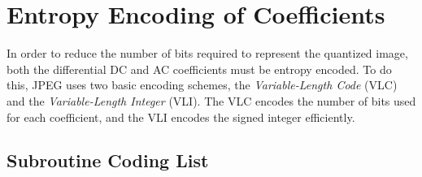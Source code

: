 \documentclass[paper=a4, fontsize=11pt]{scrartcl} %
\numberwithin{equation}{section} %
\numberwithin{figure}{section} %
\numberwithin{table}{section} %
\begin{document}
\section{Entropy Encoding of Coefficients}

In order to reduce the number of bits required to represent the quantized image, both the
differential DC and AC coefficients must be entropy encoded. To do this, JPEG uses two
basic encoding schemes, the \emph{Variable-Length Code} (VLC) and the \emph{Variable-Length Integer}
(VLI). The VLC encodes the number of bits used for each coefficient, and the VLI encodes
the signed integer efficiently.

\subsection{Subroutine Coding List} 
\end{document}
